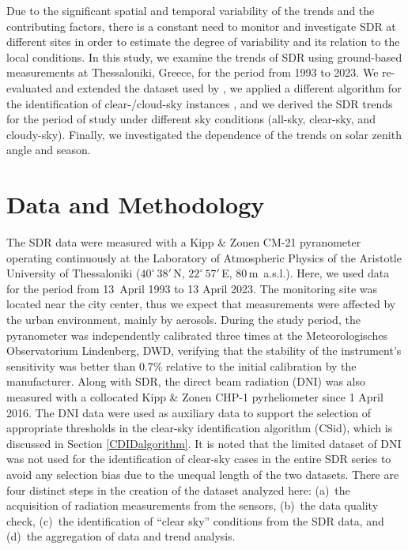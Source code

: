 \documentclass[applsci,article,accept,moreauthors,pdftex]{Definitions/mdpi}
\begin{document}
Due to the significant spatial and temporal variability of the trends
and the contributing factors, there is a constant need to monitor and
investigate SDR at different sites in order to estimate the degree of
variability and its relation to the local conditions. In this study, we
examine the trends of SDR using ground-based measurements at
Thessaloniki, Greece, for the period from 1993 to 2023. We re-evaluated and
extended the dataset used by \citet{Bais2013}, we applied a different
algorithm for the identification of clear-/cloud-sky instances
\citep{Reno2016, Reno2012a}, and we derived the SDR trends for the
period of study under different sky conditions (all-sky, clear-sky, and
cloudy-sky). Finally, we investigated the dependence of the trends on
solar zenith angle and season.

\hypertarget{data-and-methodology}{%
\section{Data and Methodology}\label{data-and-methodology}}

The SDR data were measured with a Kipp \& Zonen CM-21 pyranometer
operating continuously at the Laboratory of Atmospheric Physics of the
Aristotle University of Thessaloniki (\(40^\circ\,38'\,\)N,
\(22^\circ\,57'\,\)E, \(80\,\)m~a.s.l.). Here, we used data for the period
from 13~April 1993 to 13 April 2023. The monitoring site was located near the
city center, thus we expect that measurements were affected by the urban
environment, mainly by aerosols. During the study period, the
pyranometer was independently calibrated three times at the
Meteorologisches Observatorium Lindenberg, DWD, verifying that the
stability of the instrument's sensitivity was better than \(0.7\%\)
relative to the initial calibration by the manufacturer. Along with SDR,
the direct beam radiation (DNI) was also measured with a collocated Kipp
\& Zonen CHP-1 pyrheliometer since 1 April 2016. The DNI data were used as
auxiliary data to support the selection of appropriate thresholds in the
clear-sky identification algorithm (CSid), which is discussed in Section
\ref{CDIDalgorithm}. It is noted that the limited dataset of DNI was not
used for the identification of clear-sky cases in the entire SDR series
to avoid any selection bias due to the unequal length of the two datasets.
There are four distinct steps in the creation of the dataset analyzed
here: (a)~the acquisition of radiation measurements from the sensors,
(b)~the data quality check, (c)~the identification of ``clear sky''
conditions from the SDR data, and (d)~the aggregation of data and trend
analysis.
\end{document}
